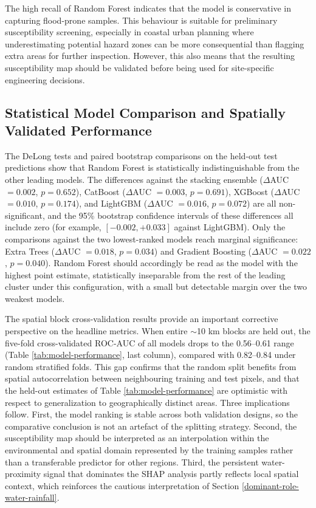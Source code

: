 \documentclass[11pt,twoside]{article}
\begin{document}
The high recall of Random Forest indicates that the model is conservative in
capturing flood-prone samples. This behaviour is suitable for preliminary
susceptibility screening, especially in coastal urban planning where
underestimating potential hazard zones can be more consequential than flagging
extra areas for further inspection. However, this also means that the resulting
susceptibility map should be validated before being used for site-specific
engineering decisions.

\subsection{Statistical Model Comparison and Spatially Validated Performance}\label{spatial-cv-results}

The DeLong tests and paired bootstrap comparisons on the held-out test
predictions show that Random Forest is statistically indistinguishable from the
other leading models. The differences against the stacking ensemble
($\Delta$AUC $= 0.002$, $p = 0.652$), CatBoost ($\Delta$AUC $= 0.003$,
$p = 0.691$), XGBoost ($\Delta$AUC $= 0.010$, $p = 0.174$), and LightGBM
($\Delta$AUC $= 0.016$, $p = 0.072$) are all non-significant, and the 95\%
bootstrap confidence intervals of these differences all include zero (for
example, $[-0.002, +0.033]$ against LightGBM). Only the comparisons against the
two lowest-ranked models reach marginal significance: Extra Trees
($\Delta$AUC $= 0.018$, $p = 0.034$) and Gradient Boosting ($\Delta$AUC
$= 0.022$, $p = 0.040$). Random Forest should accordingly be read as the model
with the highest point estimate, statistically inseparable from the rest of the
leading cluster under this configuration, with a small but detectable margin
over the two weakest models.

The spatial block cross-validation results provide an important corrective
perspective on the headline metrics. When entire $\sim$10 km blocks are held
out, the five-fold cross-validated ROC-AUC of all models drops to the
0.56--0.61 range (Table \ref{tab:model-performance}, last column), compared with
0.82--0.84 under random stratified folds. This gap confirms that the random
split benefits from spatial autocorrelation between neighbouring training and
test pixels, and that the held-out estimates of Table \ref{tab:model-performance}
are optimistic with respect to generalization to geographically distinct areas.
Three implications follow. First, the model ranking is stable across both
validation designs, so the comparative conclusion is not an artefact of the
splitting strategy. Second, the susceptibility map should be interpreted as an
interpolation within the environmental and spatial domain represented by the
training samples rather than a transferable predictor for other regions. Third,
the persistent water-proximity signal that dominates the SHAP analysis partly
reflects local spatial context, which reinforces the cautious interpretation of
Section \ref{dominant-role-water-rainfall}.
\end{document}
